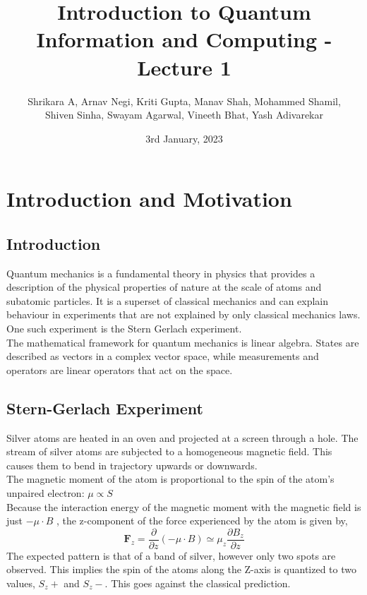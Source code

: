\documentclass{article}
\title{Introduction to Quantum Information and Computing - Lecture 1}
\author{Shrikara A, Arnav Negi, Kriti Gupta, Manav Shah, Mohammed Shamil,\\ Shiven Sinha, Swayam Agarwal, Vineeth Bhat, Yash Adivarekar} %
\date{3rd January, 2023}
\begin{document}
    \maketitle
    \vfill
    \tableofcontents
    \newpage


    \section{Introduction and Motivation}
        \subsection{Introduction}

            Quantum mechanics is a fundamental theory in physics that provides a description of the physical properties of nature at the scale of atoms and subatomic particles. It is a superset of classical mechanics and can explain
            behaviour in experiments that are not explained by only classical mechanics laws. One such experiment is
            the Stern Gerlach experiment.\\

            The mathematical framework for quantum mechanics is linear algebra. States are described as vectors in a complex
            vector space, while measurements and operators are linear operators that act on the space.\\
            
            
        \subsection{Stern-Gerlach Experiment}

            Silver atoms are heated in an oven and projected at a screen through a hole. The stream of silver atoms 
            are subjected to a homogeneous magnetic field. This causes them to bend in trajectory upwards or downwards.\\

            The magnetic moment of the atom is proportional to the spin of the atom's unpaired electron: $\mu \propto S$\\
            
            Because the interaction energy of the magnetic moment with the magnetic field
            is just $-\mu \cdot B$ , the z-component of the force experienced by the atom is given by,
            $$\textbf{F}_z = \frac{\partial}{\partial z}(-\mu \cdot B) \simeq \mu_z\frac{\partial B_z}{\partial z}$$
            The expected pattern is that of a band of silver, however only two spots are observed. This implies
            the spin of the atoms along the Z-axis is quantized to two values, $S_z+$ and $S_z-$. This goes against the classical prediction.
\end{document}
